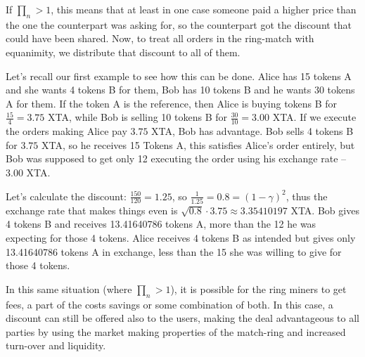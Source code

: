 \documentclass{article}
\theoremstyle{remark}
\theoremstyle{definition}
\begin{document}
If $\prod_n>1$, this means that at least in one case someone paid a higher price than the one the counterpart was asking for, so the counterpart got the discount that could have been shared. Now, to treat all orders in the ring-match with equanimity, we distribute that discount to all of them. 

Let's recall our first example to see how this can be done. Alice has 15 tokens A and she wants 4 tokens B for them, Bob has 10 tokens B and he wants 30 tokens A for them. If the token A is the reference, then Alice is buying tokens B for $\frac{15}{4}=3.75$ XTA, while Bob is selling 10 tokens B for $\frac{30}{10}=3.00$ XTA. If we execute the orders making Alice pay $3.75$ XTA, Bob has advantage. Bob sells 4 tokens B for $3.75$ XTA, so he receives 15 Tokens A, this satisfies Alice's order entirely, but Bob was supposed to get only 12 executing the order using his exchange rate -- $3.00$ XTA. 

Let's calculate the discount: $\frac{150}{120}=1.25$, so $\frac{1}{1.25}=0.8=(1-\gamma)^2$, thus the exchange rate that makes things even is $\sqrt{0.8}\cdot 3.75\approx 3.35410197$ XTA. Bob gives 4 tokens B and receives 13.41640786 tokens A, more than the 12 he was expecting for those 4 tokens. Alice receives 4 tokens B as intended but gives only 13.41640786 tokens A in exchange, less than the 15 she was willing to give for those 4 tokens.

In this same situation (where $\prod_n>1$), it is possible for the ring miners to get fees, a part of the costs savings or some combination of both. In this case, a discount can still be offered also to the users, making the deal advantageous to all parties by using the market making properties of the match-ring and increased turn-over and liquidity.



\end{document}

